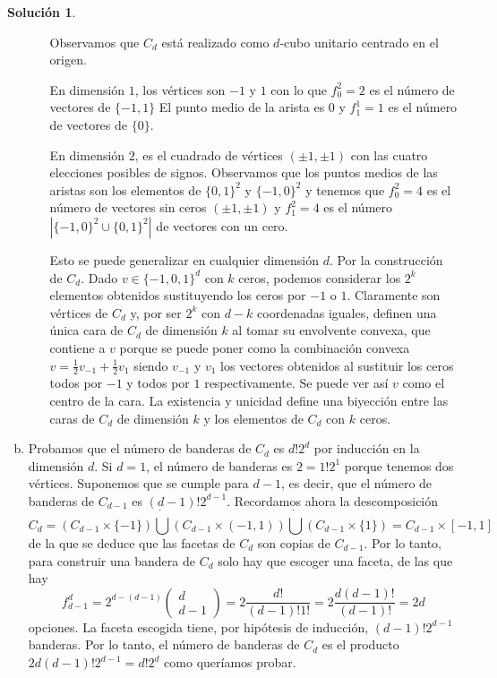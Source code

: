 \documentclass[10pt]{article}
\theoremstyle{definition}
\newtheorem*{sol}{Solución}
\begin{document}
\begin{sol}
\begin{enumerate}[(a)]
\begin{enumerate}[i.]
Observamos que $C_d$ está realizado como $d$-cubo unitario centrado en el origen.

En dimensión $1$, los vértices son $-1$ y $1$ con lo que $f_0^2=2$ es el número de vectores de $\{-1,1\}$ El punto medio de la arista es $0$ y $f_1^1=1$ es el número de vectores de $\{0\}$.

En dimensión $2$, es el cuadrado de vértices $(\pm 1,\pm 1)$ con las cuatro elecciones posibles de signos. Observamos que los puntos medios de las aristas son los elementos de $\{0,1\}^2$ y $\{-1,0\}^2$ y tenemos que $f_0^2=4$ es el número de vectores sin ceros $(\pm 1,\pm 1)$ y $f_1^2=4$ es el número $|\{-1,0\}^2\cup\{0,1\}^2|$ de vectores con un cero.

Esto se puede generalizar en cualquier dimensión $d$. Por la construcción de $C_d$. Dado $v\in\{-1,0,1\}^d$ con $k$ ceros, podemos considerar los $2^k$ elementos obtenidos sustituyendo los ceros por $-1$ o $1$. Claramente son vértices de $C_d$ y, por ser $2^k$ con $d-k$ coordenadas iguales, definen una única cara de $C_d$ de dimensión $k$ al tomar su envolvente convexa, que contiene a $v$ porque se puede poner como la combinación convexa $v=\frac{1}{2}v_{-1}+\frac{1}{2}v_{1}$ siendo $v_{-1}$ y $v_{1}$ los vectores obtenidos al sustituir los ceros todos por $-1$ y todos por $1$ respectivamente. Se puede ver así $v$ como el centro de la cara. La existencia y unicidad define una biyección entre las caras de $C_d$ de dimensión $k$ y los elementos de $C_d$ con $k$ ceros.
\end{enumerate}
\item Probamos que el número de banderas de $C_d$ es $d!2^d$ por inducción en la dimensión $d$. Si $d=1$, el número de banderas es $2=1!2^1$ porque tenemos dos vértices. Suponemos que se cumple para $d-1$, es decir, que el número de banderas de $C_{d-1}$ es $(d-1)!2^{d-1}$. Recordamos ahora la descomposición \[C_d=\left(C_{d-1}\times\{-1\}\right)\dot\bigcup \left(C_{d-1}\times (-1,1)\right)\dot\bigcup\left( C_{d-1}\times\{1\}\right)=C_{d-1}\times [-1,1]\]
de la que se deduce que las facetas de $C_d$ son copias de $C_{d-1}$. Por lo tanto, para construir una bandera de $C_d$ solo hay que escoger una faceta, de las que hay
\[f_{d-1}^d=2^{d-(d-1)}\begin{pmatrix}d\\ d-1\end{pmatrix}=2\frac{d!}{(d-1)!1!}=2\frac{d(d-1)!}{(d-1)!}=2d\]
opciones. La faceta escogida tiene, por hipótesis de inducción, $(d-1)!2^{d-1}$ banderas. Por lo tanto, el número de banderas de $C_d$ es el producto $2d(d-1)!2^{d-1}=d!2^d$ como queríamos probar.


\end{enumerate}
\end{sol}
\end{document}
